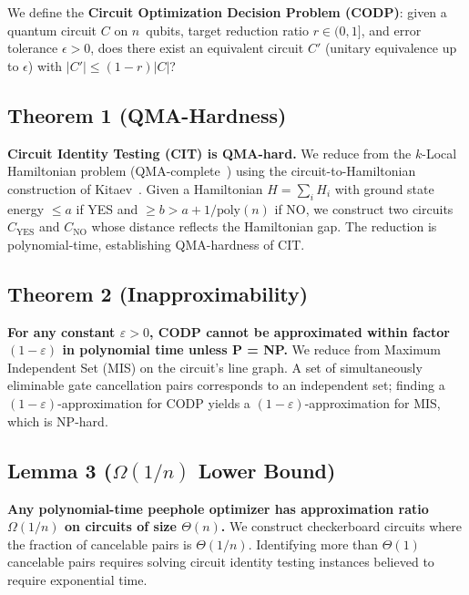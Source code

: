\documentclass[aps,preprint,secnum,lined]{revtex4-2}
\begin{document}
We define the \textbf{Circuit Optimization Decision Problem (CODP)}: given a quantum circuit $C$ on $n$~qubits, target reduction ratio $r \in (0,1]$, and error tolerance $\epsilon > 0$, does there exist an equivalent circuit $C'$ (unitary equivalence up to $\epsilon$) with $|C'| \leq (1-r)|C|$?

\subsection{Theorem 1 (QMA-Hardness)}

\textbf{Circuit Identity Testing (CIT) is QMA-hard.} We reduce from the $k$-Local Hamiltonian problem (QMA-complete~\cite{kempe2006complexity}) using the circuit-to-Hamiltonian construction of Kitaev~\cite{kitaev1997quantum}. Given a Hamiltonian $H = \sum_i H_i$ with ground state energy $\leq a$ if YES and $\geq b > a + 1/\text{poly}(n)$ if NO, we construct two circuits $C_{\text{YES}}$ and $C_{\text{NO}}$ whose distance reflects the Hamiltonian gap. The reduction is polynomial-time, establishing QMA-hardness of CIT.

\subsection{Theorem 2 (Inapproximability)}

\textbf{For any constant $\varepsilon > 0$, CODP cannot be approximated within factor $(1-\varepsilon)$ in polynomial time unless P = NP.} We reduce from Maximum Independent Set (MIS) on the circuit's line graph. A set of simultaneously eliminable gate cancellation pairs corresponds to an independent set; finding a $(1-\varepsilon)$-approximation for CODP yields a $(1-\varepsilon)$-approximation for MIS, which is NP-hard.

\subsection{Lemma 3 ($\Omega(1/n)$ Lower Bound)}

\textbf{Any polynomial-time peephole optimizer has approximation ratio $\Omega(1/n)$ on circuits of size $\Theta(n)$.} We construct checkerboard circuits where the fraction of cancelable pairs is $\Theta(1/n)$. Identifying more than $\Theta(1)$ cancelable pairs requires solving circuit identity testing instances believed to require exponential time.

\end{document}

